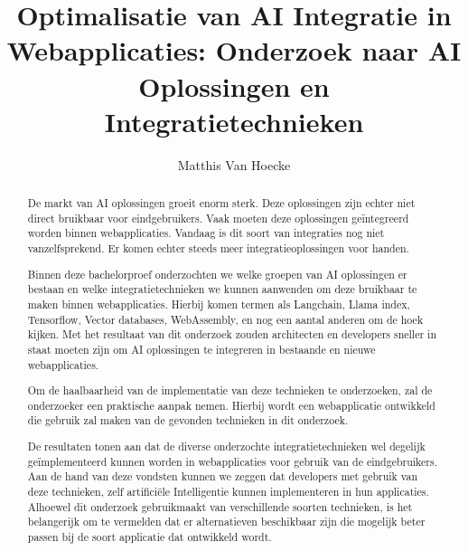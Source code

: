 \documentclass[dutch]{hogent-article}
\title{Optimalisatie van AI Integratie in Webapplicaties: Onderzoek naar AI Oplossingen en Integratietechnieken}
\author{Matthis Van Hoecke}
\begin{document}
\begin{abstract}
  
  De markt van AI oplossingen groeit enorm sterk. Deze oplossingen zijn echter niet direct
bruikbaar voor eindgebruikers. Vaak moeten deze oplossingen geïntegreerd worden binnen
webapplicaties. Vandaag is dit soort van integraties nog niet vanzelfsprekend. Er komen
echter steeds meer integratieoplossingen voor handen.
  
  \setlength{\parskip}{1em}
  
  Binnen deze bachelorproef onderzochten we welke groepen van AI oplossingen er
bestaan en welke integratietechnieken we kunnen aanwenden om deze bruikbaar te maken
binnen webapplicaties. Hierbij komen termen als Langchain, Llama index, Tensorflow, Vector
databases, WebAssembly, en nog een aantal anderen om de hoek kijken. Met het resultaat van dit onderzoek
zouden architecten en developers sneller in staat moeten zijn om AI oplossingen te
integreren in bestaande en nieuwe webapplicaties.
  
 Om de haalbaarheid van de implementatie van deze technieken te onderzoeken, zal de onderzoeker een praktische aanpak nemen. Hierbij wordt een webapplicatie ontwikkeld die gebruik zal maken van de gevonden technieken in dit onderzoek.
  
  De resultaten tonen aan dat de diverse onderzochte integratietechnieken wel degelijk geïmplementeerd kunnen worden in webapplicaties voor gebruik van de eindgebruikers. 
  Aan de hand van deze vondsten kunnen we zeggen dat developers met gebruik van deze technieken, zelf artificiële Intelligentie kunnen implementeren in hun applicaties. 
  Alhoewel dit onderzoek gebruikmaakt van verschillende soorten technieken, is het belangerijk om te vermelden dat er alternatieven beschikbaar zijn die mogelijk beter passen bij de soort applicatie dat ontwikkeld wordt.

\end{abstract}

\tableofcontents

\bigskip



\end{document}
